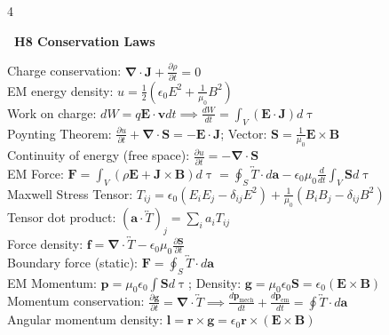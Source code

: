 \documentclass[a4paper,twoside]{article}
\newcommand{\secblock}[1]{%
\par\vspace{1.5pt}%
\noindent\colorbox{hdrcol}{\parbox[c][0.95em][c]{0.99\linewidth}{\color{white}\bfseries\scriptsize \ #1}}\par
\vspace{0.8pt}%
}
\begin{document}
\begin{multicols*}{4}
\secblock{H8 Conservation Laws}
Charge conservation: \(\bm \nabla \cdot \bm J + \frac{\partial \rho}{\partial t} = 0\) \\
EM energy density: \(u = \frac{1}{2} (\epsilon_0 E^2 + \frac{1}{\mu_0} B^2)\) \\
Work on charge: \(dW = q \bm E \cdot \bm v dt \implies \frac{dW}{dt} = \int_{V} (\bm E \cdot \bm J) d\uptau\) \\
Poynting Theorem: \(\frac{\partial u}{\partial t} + \bm \nabla \cdot \bm S = -\bm E \cdot \bm J\); \quad Vector: \(\bm S = \frac{1}{\mu_0} \bm E \times \bm B\) \\
Continuity of energy (free space): \(\frac{\partial u}{\partial t} = -\bm \nabla \cdot \bm S\) \\
EM Force: \(\bm F = \int_V (\rho \bm E + \bm J \times \bm B) d\uptau = \oint_S \overleftrightarrow{T} \cdot d\bm a - \epsilon_0 \mu_0 \frac{d}{dt} \int_V \bm S d\uptau\) \\
Maxwell Stress Tensor: \(T_{ij} = \epsilon_0 (E_iE_j-\delta_{ij}E^2) +\frac{1}{\mu_0} (B_iB_j-\delta_{ij}B^2)\) \\
Tensor dot product: \((\bm a \cdot \overleftrightarrow{T})_j = \sum_i a_i T_{ij}\) \\
Force density: \(\bm f = \bm\nabla \cdot \overleftrightarrow{T} - \epsilon_0 \mu_0 \frac{\partial \bm S}{\partial t}\) \\
Boundary force (static): \(\bm F = \oint _S \overleftrightarrow{T} \cdot d\bm a\) \\
EM Momentum: \(\bm p = \mu_0 \epsilon_0 \int \bm S d\uptau\); \quad Density: \(\bm g = \mu_0 \epsilon_0 \bm S = \epsilon_0 (\bm E \times \bm B)\) \\
Momentum conservation: \(\frac{\partial \bm g}{\partial t} = \bm \nabla \cdot \overleftrightarrow{T} \implies \frac{d\bm p_{\text{mech}}}{dt} + \frac{d\bm p_{\text{em}}}{dt} = \oint \overleftrightarrow{T} \cdot d\bm a\) \\
Angular momentum density: $\bm l = \bm r \times \bm g = \epsilon_0 \bm r \times (\bm E \times \bm B)$


\end{multicols*}
\end{document}
